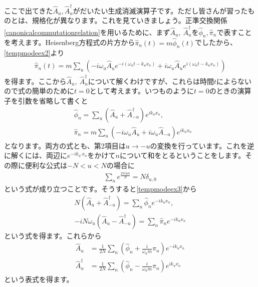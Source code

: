 \documentclass[report,paper=a4, fontsize=12pt, line_length=16cm, number_of_lines=33,dvipdfmx]{jlreq}
\numberwithin{equation}{chapter}
\newcommand{\phih}{\hat{\phi}}
\newcommand{\pih}{\hat{\pi}}
\newcommand{\Ah}{\widehat{A}}
\begin{document}
ここで出てきた$\Ah_u,\Ah_u^{\dag}$がだいたい生成消滅演算子です。ただし皆さんが習ったものとは、規格化が異なります。これを見ていきましょう。正準交換関係\eqref{canonicalcommutationrelation}を用いるために、まず$\Ah_u,\ \Ah_u^{\dag}$を$\phih_n,\pih_n$で表すことを考えます。Heisenberg方程式の片方から$\pih_n(t)=m\phih_n(t)$でしたから、\eqref{tempmodeex2}より
\begin{align}
  \pih_n(t)=m\sum_{u}(-i\omega_{u}\Ah_{u}e^{-i(\omega_u t-k_u x_n)}+i\omega_u\Ah_{u}e^{i(\omega_u t-k_u x_n)})
\end{align}
を得ます。ここから$\Ah_u,\ \Ah_u^{\dag}$について解くわけですが、これらは時間$t$によらないので式の簡単のために$t=0$として考えます。いつものように$t=0$のときの演算子を引数を省略して書くと
\begin{align}
  &\phih_n=\sum_{u}(\Ah_{u}+\Ah_{-u}^{\dag})e^{ik_u x_n},\\
  &\pih_n=m\sum_{u}(-i\omega_{u}\Ah_{u}+i\omega_u\Ah_{-u})e^{ik_u x_n}\label{tempmodeex3}
\end{align}
となります。両方の式とも、第2項目は$u\to -u$の変換を行っています。これを逆に解くには、両辺に$e^{-ik_{u'}x_n}$をかけて$n$について和をとるということをします。その際に便利な公式は$-N<u<N$の場合に
\begin{align}
  \sum_{n}e^{\frac{2\pi i u n}{N}}=N\delta_{u,0}
\end{align}
という式が成り立つことです。そうすると\eqref{tempmodeex3}から
\begin{align}
  N(\Ah_u+\Ah_{-u}^{\dag}) =\sum_{n}\phih_n e^{-ik_u x_n},\nonumber\\
  -iN\omega_{u}(\Ah_u-\Ah_{-u}^{\dag})  =\sum_{n}\pih_n e^{-ik_u x_n}
\end{align}
という式を得ます。これらから
\begin{align}
  \Ah_u&=\frac{1}{2N}\sum_{n}(\phih_n+\frac{i}{\omega_u m}\pih_n)e^{-ik_ux_n}\nonumber\\
  \Ah_u^{\dag}&=\frac{1}{2N}\sum_{n}(\phih_n-\frac{i}{\omega_u m}\pih_n)e^{ik_ux_n}\label{tempmodeex4}
\end{align}
という表式を得ます。
\end{document}
